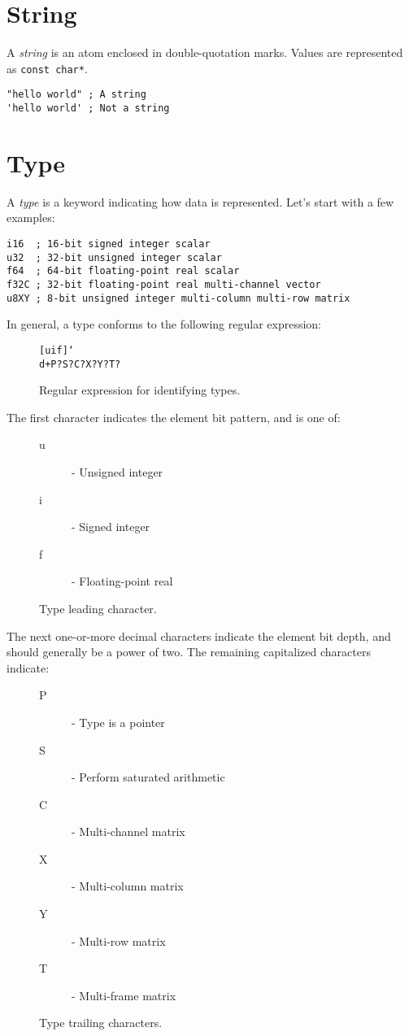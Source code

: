\documentclass[twoside=false, numbers=noenddot]{scrbook}
\newcommand{\dindex}[1]{\emph{#1}\index{#1}}
\newcommand{\pindex}[1]{#1\index{#1}}
\begin{document}
\section{String}
A \dindex{string} is an \pindex{atom} enclosed in double-quotation marks.
Values are represented as \texttt{const char*}.

\begin{verbatim}
"hello world" ; A string
'hello world' ; Not a string
\end{verbatim}

\section{Type}
\label{sec:type}
A \dindex{type} is a keyword indicating how data is represented.
Let's start with a few examples:

\begin{verbatim}
i16  ; 16-bit signed integer scalar
u32  ; 32-bit unsigned integer scalar
f64  ; 64-bit floating-point real scalar
f32C ; 32-bit floating-point real multi-channel vector
u8XY ; 8-bit unsigned integer multi-column multi-row matrix
\end{verbatim}

In general, a \pindex{type} conforms to the following regular expression:

\begin{figure}[h]
\centering
\texttt{[uif]\char`\\ d+P?S?C?X?Y?T?}
\caption{Regular expression for identifying types.}
\end{figure}

The first character indicates the element bit pattern, and is one of:

\begin{figure}[h]
\begin{description}
\item[u] - Unsigned integer
\item[i] - Signed integer
\item[f] - Floating-point real
\end{description}
\caption{Type leading character.}
\end{figure}

The next one-or-more decimal characters indicate the element bit depth, and should generally be a power of two.
The remaining capitalized characters indicate:

\begin{figure}[h]
\begin{description}
\item[P] - Type is a pointer
\item[S] - Perform saturated arithmetic
\item[C] - Multi-channel matrix
\item[X] - Multi-column matrix
\item[Y] - Multi-row matrix
\item[T] - Multi-frame matrix
\end{description}
\caption{Type trailing characters.}
\end{figure}
\end{document}

